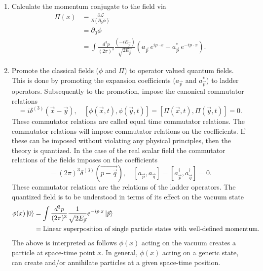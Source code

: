 \begin{enumerate}
	\item Calculate the momentum conjugate to the field via
	\begin{equation}
		\begin{split}
			\Pi(x)&\equiv \frac{\partial \mathcal{L}}{\partial (\partial_0\phi)}\\
			&=\partial_0\phi\\
			&=\int \frac{d^3 p}{(2\pi)^3}\frac{(-iE_{\vec{p}})}{\sqrt{2E_{\vec{p}}}}(a_{\vec{p}}\,e^{ip\cdot x}-a_{\vec{p}}^*\,e^{-ip\cdot x}).
		\end{split}
	\end{equation} 
	
	\item Promote the classical fields ($\phi$ and $\Pi$) to operator valued quantum fields. This is done by promoting the expansion coefficients ($a_{\vec{p}}$ and $a_{\vec{p}}^*$) to ladder operators. Subsequently to the promotion, impose the canonical commutator relations
	\begin{equation}
		[\phi(\vec{x},t),\Pi(\vec{y},t)]=i\delta^{(3)}(\vec{x}-\vec{y}),\quad [\phi(\vec{x},t),\phi(\vec{y},t)]=[\Pi(\vec{x},t),\Pi(\vec{y},t)]=0.
	\end{equation} 
	These commutator relations are called equal time commutator relations. The commutator relations will impose commutator relations on the coefficients. If these can be imposed without violating any physical principles, then the theory is quantized. In the case of the real scalar field the commutator relations of the fields imposes on the coefficients
	\begin{equation}
		[a_{\vec{p}},a_{\vec{q}}^\dagger]=(2\pi)^3\delta^{(3)}(\vec{p-\vec{q}}), \quad [a_{\vec{p}},a_{\vec{q}}]=[a_{\vec{p}}^\dagger,a_{\vec{q}}^\dagger]=0.
	\end{equation} 
	These commutator relations are the relations of the ladder operators. The quantized field is to be understood in terms of its effect on the vacuum state
	\begin{equation}
		\begin{split}
			\phi(x)\ket{0}&=\int \frac{d^3p}{(2\pi)^3}\frac{1}{\sqrt{2E_{\vec{p}}}} e^{-ip\cdot x}\ket{\vec{p}}\\
			&=\text{Linear superposition of single particle states with well-defined momentum.}\\
		\end{split}
	\end{equation} 
	The above is interpreted as follows $\phi(x)$ acting on the vacuum creates a particle at space-time point $x$. In general, $\phi(x)$ acting on a generic state, can create and/or annihilate particles at a given space-time position.

\end{enumerate}
